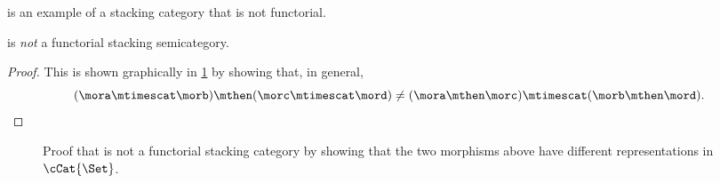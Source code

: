 \Effects is an example of a stacking category that is not functorial.

\begin{lemma}
    \Effects is \emph{not} a functorial stacking semicategory.
\end{lemma}

\begin{proof}
    This is shown graphically in \cref{fig:effects-non-functorial} by showing that, in general,
    \begin{equation*}
        (\mora \mtimescat \morb )
        \mthen (\morc \mtimescat \mord )
        \neq
        (\mora \mthen \morc ) \mtimescat (\morb \mthen \mord ).
    \end{equation*}
\end{proof}

\begin{figure*}[b]
    \centering
    \caption{Proof that \Effects is not a functorial stacking category by showing that
        the two morphisms above have different representations in~$\cCat{\Set}$.}
    \label{fig:effects-non-functorial}
\end{figure*}



